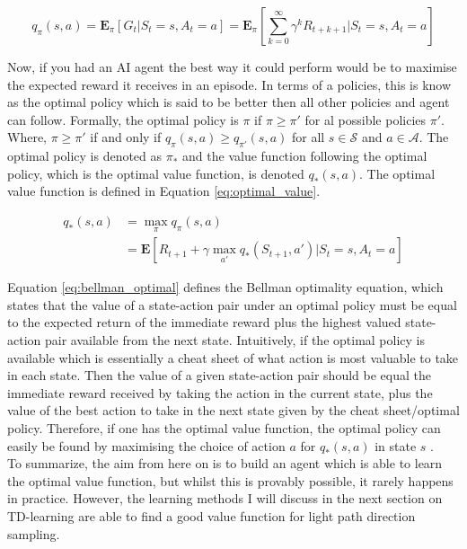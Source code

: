 \documentclass[ %
                    author={Callum Pearce},
                supervisor={Dr. Neill Campbell},
                    degree={MEng},
                     title={How effective are Temporal difference learning methods for reducing the number of zero contribution light paths while still accurately approximating Global Illumination in Path tracing?},
                  subtitle={},
                      type={research},
                      year={2019} ]{dissertation}
\begin{document}
\begin{equation}
\label{eq:value_function}
q_\pi(s, a) = \mathbf{E}_\pi[G_t | S_t = s, A_t = a] = \mathbf{E}_\pi [\sum_{k=0}^{\infty} \gamma^k R_{t+k+1} | S_t = s, A_t = a]
\end{equation}

Now, if you had an AI agent the best way it could perform would be to maximise the expected reward it receives in an episode. In terms of a policies, this is know as the optimal policy which is said to be better then all other policies and agent can follow. Formally, the optimal policy is $\pi$ if $\pi \geq \pi'$ for al possible policies $\pi'$. Where, $\pi \geq \pi'$ if and only if $q_\pi(s,a) \geq q_{\pi'}(s,a)$ for all $s \in \mathcal{S}$ and $a \in \mathcal{A}$. The optimal policy is denoted as $\pi_*$ and the value function following the optimal policy, which is the optimal value function, is denoted $q_*(s,a)$. The optimal value function is defined in Equation \ref{eq:optimal_value}.

\begin{align}
q_*(s,a) & = \max_\pi q_\pi(s,a) \label{eq:optimal_value} \\
 & = \mathbf{E}[R_{t+1} + \gamma \max_{a'} q_* (S_{t+1}, a') | S_t = s, A_t = a]  \label{eq:bellman_optimal}
\end{align}

Equation \ref{eq:bellman_optimal} defines the Bellman optimality equation, which states that the value of a state-action pair under an optimal policy must be equal to the expected return of the immediate reward plus the highest valued state-action pair available from the next state. Intuitively, if the optimal policy is available which is essentially a cheat sheet of what action is most valuable to take in each state. Then the value of a given state-action pair should be equal the immediate reward received by taking the action in the current state, plus the value of the best action to take in the next state given by the cheat sheet/optimal policy. Therefore, if one has the optimal value function, the optimal policy can easily be found by maximising the choice of action $a$ for $q_*(s,a)$  in state $s$ \cite{sutton2011reinforcement}. \\ 

To summarize, the aim from here on is to build an agent which is able to learn the optimal value function, but whilst this is provably possible, it rarely happens in practice. However, the learning methods I will discuss in the next section on TD-learning are able to find a good value function for light path direction sampling.
\end{document}
